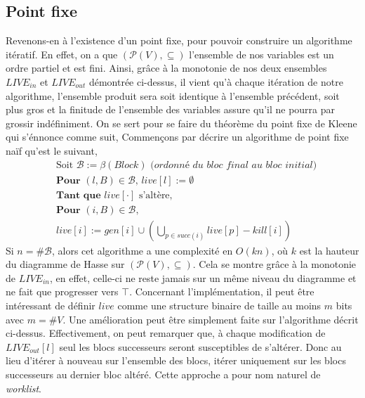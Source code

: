 \subsection{Point fixe}
Revenons-en à l'existence d'un point fixe, pour pouvoir construire un algorithme itératif. En effet,
on a que $(\mathcal{P}(V), \subseteq)$ l'ensemble de nos variables est un ordre partiel et est fini.
Ainsi, grâce à la monotonie de nos deux ensembles $LIVE_{in}$ et $LIVE_{out}$ démontrée ci-dessus, il
vient qu'à chaque itération de notre algorithme, l'ensemble produit sera soit identique à l'ensemble précédent,
soit plus gros et la finitude de l'ensemble des variables assure qu'il ne pourra par grossir indéfiniment. On se sert pour se faire
du théorème du point fixe de Kleene qui s'énnonce comme suit,
\newline
\newline
{}
Commençons par décrire un algorithme de point fixe naïf qu'est le suivant,
\begin{align*}
	&\text{Soit } \mathcal{B} := \beta(Block) \textit{  (ordonné du bloc final au bloc initial)}\\
	&\textbf{Pour } (l, B) \in \mathcal{B}\text{, } live[l] := \emptyset\\
	&\textbf{Tant que }live[\cdot]\text{ s'altère,}\\
	&\textbf{Pour } (i, B) \in \mathcal{B}\text{, }\\
	&live[i] := gen[i] \cup (\bigcup\limits_{p\in succ(i)} live[p] - kill[i])
\end{align*}
Si $n = \#\mathcal{B}$, alors cet algorithme a une complexité en $O(kn)$, où $k$ est la hauteur du diagramme
de Hasse sur $(\mathcal{P}(V), \subseteq)$. Cela se montre grâce à la monotonie de $LIVE_{in}$, en effet, 
celle-ci ne reste jamais sur un même niveau du diagramme et ne fait que progresser vers $\top$.
Concernant l'implémentation, il peut être intéressant de définir $live$ comme une structure binaire de taille au
moins $m$ bits avec $m = \#V$.
Une amélioration peut être simplement faite sur l'algorithme décrit ci-dessus. Effectivement, on peut remarquer que,
à chaque modification de $LIVE_{out}[l]$ seul les blocs successeurs seront susceptibles de s'altérer. Donc
au lieu d'itérer à nouveau sur l'ensemble des blocs, itérer uniquement sur les blocs successeurs au dernier
bloc altéré. Cette approche a pour nom naturel de \textit{worklist}.